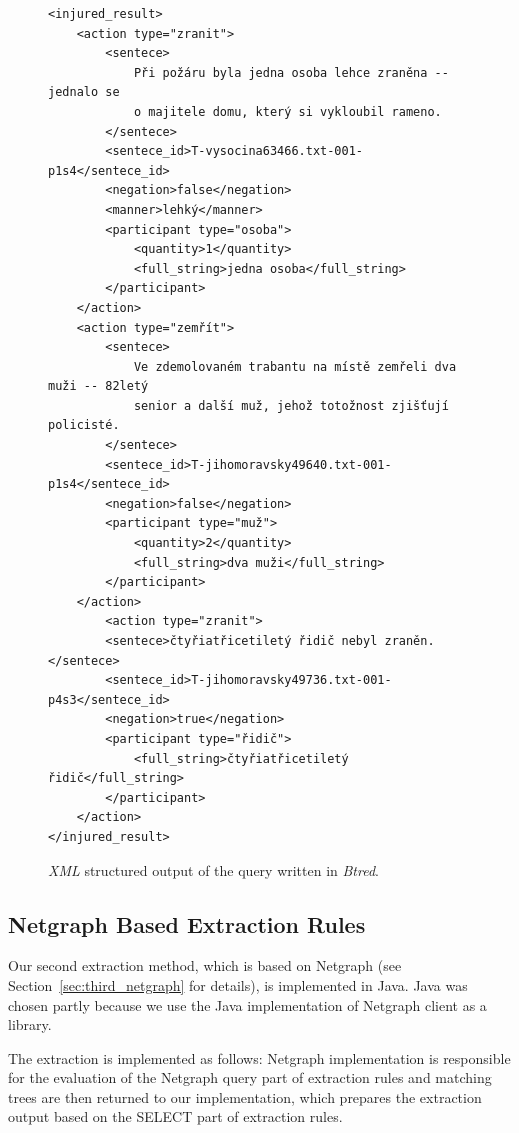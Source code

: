 \begin{figure}
\begin{verbatim}
<injured_result>
	<action type="zranit">
		<sentece>
			Při požáru byla jedna osoba lehce zraněna -- jednalo se
			o majitele domu, který si vykloubil rameno.
		</sentece>
		<sentece_id>T-vysocina63466.txt-001-p1s4</sentece_id>
		<negation>false</negation>
		<manner>lehký</manner>
		<participant type="osoba">
			<quantity>1</quantity>
			<full_string>jedna osoba</full_string>
		</participant>
	</action>
	<action type="zemřít">
		<sentece>
			Ve zdemolovaném trabantu na místě zemřeli dva muži -- 82letý
			senior a další muž, jehož totožnost zjišťují policisté.
		</sentece>
		<sentece_id>T-jihomoravsky49640.txt-001-p1s4</sentece_id>
		<negation>false</negation>
		<participant type="muž">
			<quantity>2</quantity>
			<full_string>dva muži</full_string>
		</participant>
	</action>
		<action type="zranit">
		<sentece>čtyřiatřicetiletý řidič nebyl zraněn.</sentece>
		<sentece_id>T-jihomoravsky49736.txt-001-p4s3</sentece_id>
		<negation>true</negation>
		<participant type="řidič">
			<full_string>čtyřiatřicetiletý řidič</full_string>
		</participant>
	</action>
</injured_result>
\end{verbatim}
\caption{\emph{XML} structured output of the query written in \emph{Btred}.}
\label{fig:btred_xml}
\end{figure}





\subsection{Netgraph Based Extraction Rules} \label{sec:manual_Netgraph_Based_Extraction_Rules}

Our second extraction method, which is based on Netgraph (see Section~\ref{sec:third_netgraph} for details), is implemented in Java. Java was chosen partly because we use the Java implementation of Netgraph client as a library. 



The extraction is implemented as follows: Netgraph implementation is responsible for the evaluation of the Netgraph query part of extraction rules and matching trees are then returned to our implementation, which prepares the extraction output based on the SELECT part of extraction rules.




